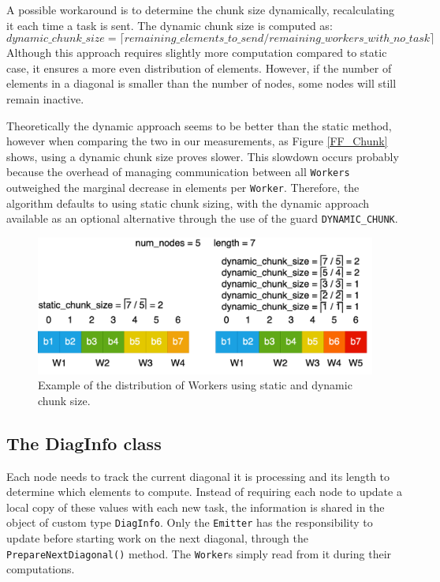 A possible workaround is to determine the chunk size dynamically, recalculating it each time a task is sent. The dynamic chunk size is computed as:
\[
    dynamic\_chunk\_size = \lceil {remaining\_elements\_to\_send / remaining\_workers\_with\_no\_task}\rceil
\]
Although this approach requires slightly more computation compared to static case, it ensures a more even distribution of elements. However, if the number of elements in a diagonal is smaller than the number of nodes, some nodes will still remain inactive.

Theoretically the dynamic approach seems to be better than the static method, however when comparing the two in our measurements, as Figure \ref{FF_Chunk} shows, using a dynamic chunk size proves slower. This slowdown occurs probably because the overhead of managing communication between all \texttt{Workers} outweighed the marginal decrease in elements per \texttt{Worker}. Therefore, the algorithm defaults to using static chunk sizing, with the dynamic approach available as an optional alternative through the use of the guard \texttt{DYNAMIC\_CHUNK}.

\begin{figure}[h]
    \centering\includegraphics[scale=0.20]{img/FastFlow/Static_vs_Dynamic.drawio.png}
    
    \caption{Example of the distribution of Workers using static and dynamic chunk size.}
\end{figure}

\subsection*{The DiagInfo class}
Each node needs to track the current diagonal it is processing and its length to determine which elements to compute. Instead of requiring each node to update a local copy of these values with each new task, the information is shared in the object of custom type \texttt{DiagInfo}. Only the \texttt{Emitter} has the responsibility to update before starting work on the next diagonal, through the \texttt{PrepareNextDiagonal()} method. The \texttt{Worker}s simply read from it during their computations.

